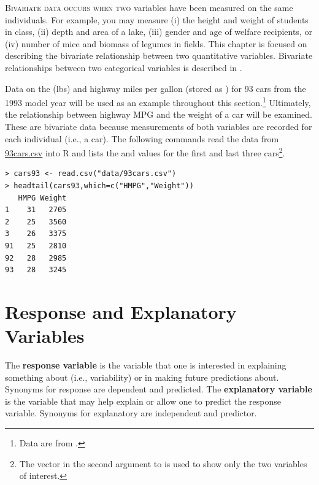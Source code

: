 \documentclass[10pt,openany]{book}\usepackage[]{graphicx}\usepackage[]{color}
\makeatletter
\newenvironment{kframe}{%
 \def\at@end@of@kframe{}%
 \ifinner\ifhmode%
  \def\at@end@of@kframe{\end{minipage}}%
  \begin{minipage}{\columnwidth}%
 \fi\fi%
 \def\FrameCommand##1{\hskip\@totalleftmargin \hskip-\fboxsep
 \colorbox{shadecolor}{##1}\hskip-\fboxsep
     \hskip-\linewidth \hskip-\@totalleftmargin \hskip\columnwidth}%
 \MakeFramed {\advance\hsize-\width
   \@totalleftmargin\z@ \linewidth\hsize
   \@setminipage}}%
 {\par\unskip\endMakeFramed%
 \at@end@of@kframe}
\newenvironment{knitrout}{}{} %
\makeatother
\begin{document}
\minitoc
\vspace{24pt}

\lettrine{B}{ivariate data occurs when two} variables have been measured on the same individuals.  For example, you may measure (i) the height and weight of students in class, (ii) depth and area of a lake, (iii) gender and age of welfare recipients, or (iv) number of mice and biomass of legumes in fields. This chapter is focused on describing the bivariate relationship between two quantitative variables. Bivariate relationships between two categorical variables is described in .


Data on the  (lbs) and highway miles per gallon (stored as ) for 93 cars from the 1993 model year will be used as an example throughout this section.\footnote{Data are from \cite{Lock1993}.}  Ultimately, the relationship between highway MPG and the weight of a car will be examined.  These are bivariate data because measurements of both variables are recorded for each individual (i.e., a car). The following commands read the data from \href{https://raw.githubusercontent.com/droglenc/NCData/master/93cars.csv}{93cars.csv} into R and lists the  and  values for the first and last three cars\footnote{The vector in the second argument to  is used to show only the two variables of interest.}.
\begin{knitrout}
\color{fgcolor}\begin{kframe}
\begin{verbatim}
> cars93 <- read.csv("data/93cars.csv")
> headtail(cars93,which=c("HMPG","Weight"))
   HMPG Weight
1    31   2705
2    25   3560
3    26   3375
91   25   2810
92   28   2985
93   28   3245
\end{verbatim}
\end{kframe}
\end{knitrout}

\section{Response and Explanatory Variables} \label{sect:RespExplan1}
\vspace{-12pt}
The \textbf{response variable} is the variable that one is interested in explaining something about (i.e., variability) or in making future predictions about.  Synonyms for response are dependent and predicted.  The \textbf{explanatory variable} is the variable that may help explain or allow one to predict the response variable.  Synonyms for explanatory are independent and predictor.
\end{document}

